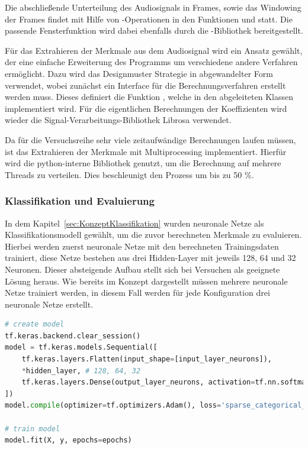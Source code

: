 Die abschließende Unterteilung des Audiosignals
in Frames, sowie das Windowing der Frames findet mit Hilfe von -Operationen in den Funktionen  und  statt.
Die passende Fensterfunktion wird dabei ebenfalls durch die -Bibliothek bereitgestellt.

Für das Extrahieren der Merkmale aus dem Audiosignal wird ein Ansatz gewählt, der eine einfache Erweiterung des Programms um verschiedene andere Verfahren ermöglicht.
Dazu wird das Designmuster Strategie in abgewandelter Form verwendet, wobei zunächst ein Interface für die Berechnungsverfahren erstellt werden muss.
Dieses definiert die Funktion , welche in den abgeleiteten Klassen implementiert wird.
Für die eigentlichen Berechnungen der Koeffizienten wird wieder die Signal-Verarbeitungs-Bibliothek Librosa verwendet.


Da für die Versuchsreihe sehr viele zeitaufwändige Berechnungen laufen müssen, ist das Extrahieren der Merkmale mit Multiprocessing implementiert.
Hierfür wird die python-interne Bibliothek  genutzt, um die Berechnung auf mehrere Threads zu verteilen.
Dies beschleunigt den Prozess um bis zu 50 \%.



\subsubsection{Klassifikation und Evaluierung}
In dem Kapitel~\ref{sec:KonzeptKlassifikation} wurden neuronale Netze als Klassifikationsmodell gewählt, um die zuvor berechneten Merkmale zu evaluieren.
Hierbei werden zuerst neuronale Netze mit den berechneten Trainingsdaten trainiert, diese Netze bestehen aus drei Hidden-Layer mit jeweils 128, 64 und 32 Neuronen.
Dieser absteigende Aufbau stellt sich bei Versuchen als geeignete Lösung heraus.
Wie bereits im Konzept dargestellt müssen mehrere neuronale Netze trainiert werden, in diesem Fall werden für jede Konfiguration drei neuronale Netze erstellt.

\begin{lstlisting}[language=Python,numbers=none,caption=Erstellen und Trainieren eines neuronalen Netzes,label=lst-nn]
# create model
tf.keras.backend.clear_session()
model = tf.keras.models.Sequential([
    tf.keras.layers.Flatten(input_shape=[input_layer_neurons]),
    *hidden_layer, # 128, 64, 32
    tf.keras.layers.Dense(output_layer_neurons, activation=tf.nn.softmax),
])
model.compile(optimizer=tf.optimizers.Adam(), loss='sparse_categorical_crossentropy', metrics=['accuracy'])

# train model
model.fit(X, y, epochs=epochs)
\end{lstlisting}

